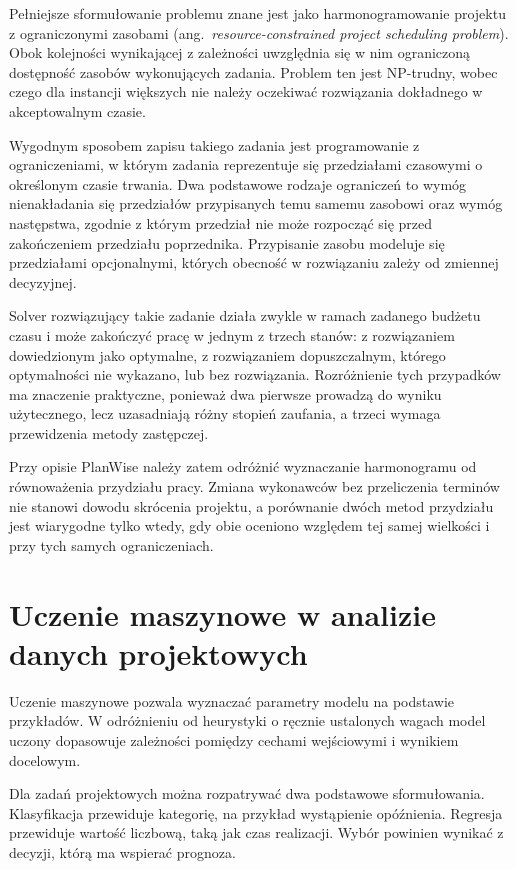 Pełniejsze sformułowanie problemu znane jest jako harmonogramowanie projektu z ograniczonymi zasobami (ang.~\textit{resource-constrained project scheduling problem}). Obok kolejności wynikającej z zależności uwzględnia się w nim ograniczoną dostępność zasobów wykonujących zadania. Problem ten jest NP-trudny, wobec czego dla instancji większych nie należy oczekiwać rozwiązania dokładnego w akceptowalnym czasie.

Wygodnym sposobem zapisu takiego zadania jest programowanie z ograniczeniami, w którym zadania reprezentuje się przedziałami czasowymi o określonym czasie trwania. Dwa podstawowe rodzaje ograniczeń to wymóg nienakładania się przedziałów przypisanych temu samemu zasobowi oraz wymóg następstwa, zgodnie z którym przedział nie może rozpocząć się przed zakończeniem przedziału poprzednika. Przypisanie zasobu modeluje się przedziałami opcjonalnymi, których obecność w rozwiązaniu zależy od zmiennej decyzyjnej.

Solver rozwiązujący takie zadanie działa zwykle w ramach zadanego budżetu czasu i może zakończyć pracę w jednym z trzech stanów: z rozwiązaniem dowiedzionym jako optymalne, z rozwiązaniem dopuszczalnym, którego optymalności nie wykazano, lub bez rozwiązania. Rozróżnienie tych przypadków ma znaczenie praktyczne, ponieważ dwa pierwsze prowadzą do wyniku użytecznego, lecz uzasadniają różny stopień zaufania, a trzeci wymaga przewidzenia metody zastępczej.

Przy opisie PlanWise należy zatem odróżnić wyznaczanie harmonogramu od równoważenia przydziału pracy. Zmiana wykonawców bez przeliczenia terminów nie stanowi dowodu skrócenia projektu, a porównanie dwóch metod przydziału jest wiarygodne tylko wtedy, gdy obie oceniono względem tej samej wielkości i przy tych samych ograniczeniach.


\section{Uczenie maszynowe w analizie danych projektowych}
\label{sec:uczenie-maszynowe}

Uczenie maszynowe pozwala wyznaczać parametry modelu na podstawie przykładów. W odróżnieniu od heurystyki o ręcznie ustalonych wagach model uczony dopasowuje zależności pomiędzy cechami wejściowymi i wynikiem docelowym.

Dla zadań projektowych można rozpatrywać dwa podstawowe sformułowania. Klasyfikacja przewiduje kategorię, na przykład wystąpienie opóźnienia. Regresja przewiduje wartość liczbową, taką jak czas realizacji. Wybór powinien wynikać z decyzji, którą ma wspierać prognoza.

